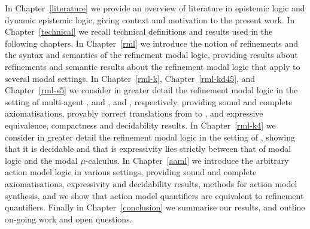In Chapter~\ref{literature} we provide an overview of literature in epistemic logic and dynamic epistemic logic, giving context and motivation to the present work.
In Chapter~\ref{technical} we recall technical definitions and results used in the following chapters.
In Chapter~\ref{rml} we introduce the notion of refinements and the syntax and semantics of the refinement modal logic, providing results about refinements and semantic results about the refinement modal logic that apply to several modal settings.
In Chapter~\ref{rml-k}, Chapter~\ref{rml-kd45}, and Chapter~\ref{rml-s5} we consider in greater detail the refinement modal logic in the setting of multi-agent \classK{}, \classKFF{} and \classKD{}, and \classS{}, respectively, providing sound and complete axiomatisations, provably correct translations from \langRml{} to \langMl{}, and expressive equivalence, compactness and decidability results.
In Chapter~\ref{rml-k4} we consider in greater detail the refinement modal logic in the setting of \classKF{}, showing that it is decidable and that is expressivity lies strictly between that of modal logic and the modal $\mu$-calculus.
In Chapter~\ref{aaml} we introduce the arbitrary action model logic in various settings, providing sound and complete axiomatisations, expressivity and decidability results, methods for action model synthesis, and we show that action model quantifiers are equivalent to refinement quantifiers.
Finally in Chapter~\ref{conclusion} we summarise our results, and outline on-going work and open questions.
